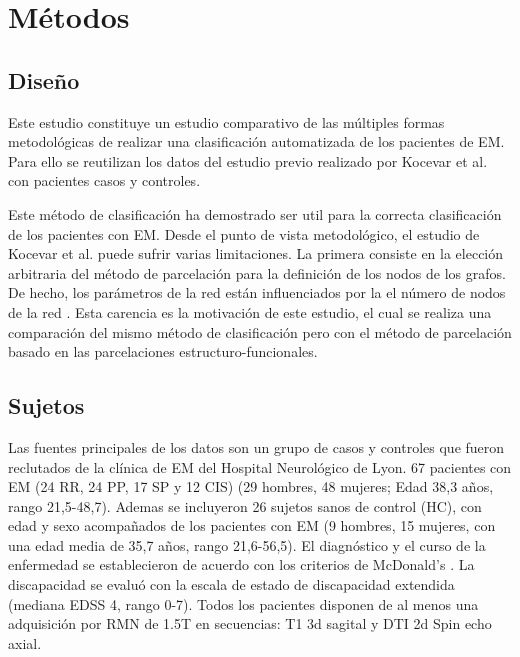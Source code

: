 \documentclass[fleqn,10pt]{UICArticle} %
\begin{document}

 

\section{Métodos}

\subsection{Diseño}
Este estudio constituye un estudio comparativo de las múltiples formas metodológicas de realizar una clasificación automatizada de los pacientes de EM. Para ello se reutilizan los datos del estudio previo realizado por Kocevar et al. \cite{Kocevar2016} con pacientes casos y controles.

Este método de clasificación ha demostrado ser util para la correcta clasificación de los pacientes con EM. Desde el punto de vista metodológico, el estudio de Kocevar et al. \cite{Kocevar2016} puede sufrir varias limitaciones. La primera consiste en la elección arbitraria del método de parcelación para la definición de los nodos de los grafos. De hecho, los parámetros de la red están influenciados por la el número de nodos de la red \cite{Zalesky2010}. Esta carencia es la motivación de este estudio, el cual se realiza una comparación del mismo método de clasificación pero con el método de parcelación basado en las parcelaciones estructuro-funcionales.

\subsection{Sujetos}
Las fuentes principales de los datos son un grupo de casos y controles que fueron reclutados de la clínica de EM del Hospital Neurológico de Lyon. 67 pacientes con EM (24 RR, 24 PP, 17 SP y 12 CIS) (29 hombres, 48 mujeres; Edad 38,3 años, rango 21,5-48,7). Ademas se incluyeron 26 sujetos sanos de control (HC), con edad y sexo acompañados de los pacientes con EM (9 hombres, 15 mujeres, con una edad media de 35,7 años, rango 21,6-56,5). El diagnóstico y el curso de la enfermedad se establecieron de acuerdo con los criterios de McDonald's \cite{Polman2011}. La discapacidad se evaluó con la escala de estado de discapacidad extendida (mediana EDSS 4, rango 0-7). Todos los pacientes disponen de al menos una adquisición por RMN de 1.5T en secuencias: T1 3d sagital y DTI 2d Spin echo axial.
\end{document}
